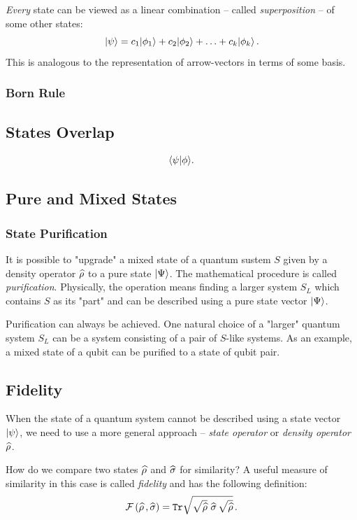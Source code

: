 \emph{Every} state can be viewed as a linear combination -- called \emph{superposition} -- of some other states:
\[
|{\psi}\rangle = c_1|{\phi_1}\rangle+c_2|{\phi_2}\rangle+\ldots+c_k|{\phi_k}\rangle\,.
\]
This is analogous to the representation of arrow-vectors in terms of some basis. 

\subsubsection*{Born Rule}


\subsection{States Overlap}
\[
\langle{\psi}|{\phi\rangle}.
\]

\subsection{Pure and Mixed States}

\subsubsection{State Purification}
It is possible to "upgrade" a mixed state of a quantum sustem $S$ given by a density operator $\widehat{\rho}$ to a pure state $|{\Psi}\rangle$. The mathematical procedure is called \emph{purification}. Physically, the operation means finding a larger system $S_L$ which contains $S$ as its "part" and can be described using a pure state vector $|{\Psi}\rangle$.

Purification can always be achieved. One natural choice of a "larger" quantum system $S_L$ can be a system consisting of a pair of $S$-like systems. As an example, a mixed state of a qubit can be purified to a state of qubit pair.


\subsection{Fidelity}
When the state of a quantum system cannot be described using a state vector $|{\psi}\rangle$, we need to use a more general approach -- \emph{state operator} or \emph{density operator} $\widehat{\rho}$.

How do we compare two states $\widehat{\rho}$ and $\widehat{\sigma}$ for similarity? A useful measure of similarity in this case is called \emph{fidelity} and has the following definition:
\[
\mathcal{F}\,(\widehat{\rho}\,,\widehat{\sigma}) = \mathtt{Tr}\sqrt{\sqrt{\widehat{\rho}}\,\,\widehat{\sigma}\,\sqrt{\widehat{\rho}}}\,.
\]

